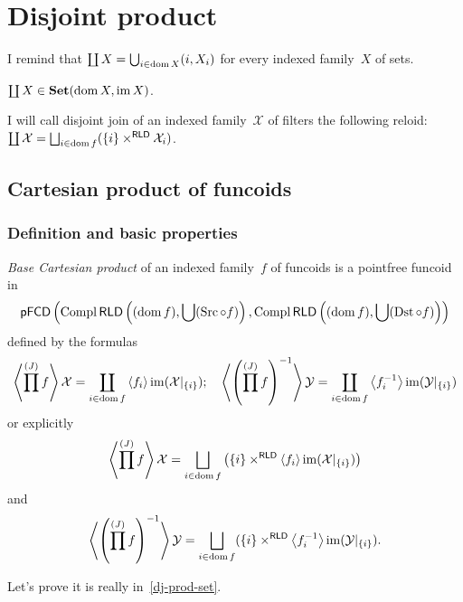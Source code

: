 \chapter{Disjoint product}

I remind that
$\coprod X = \bigcup_{i\in\operatorname{dom} X} (i,X_i)$
for every indexed family~$X$ of sets.

\begin{obvious}
$\coprod X\in\mathbf{Set}(\operatorname{dom} X,\operatorname{im} X)$.
\end{obvious}

\begin{defn}
I will call disjoint join of an indexed family~$\mathcal{X}$ of filters the following reloid: $\coprod\mathcal{X} = \bigsqcup_{i\in\dom f}(\{i\}\times^{\mathsf{RLD}}\mathcal{X}_i)$.
\end{defn}

\section{Cartesian product of funcoids}

\subsection{Definition and basic properties}

\begin{defn}
\emph{Base Cartesian product} of an indexed family~$f$ of funcoids is
a pointfree funcoid in
\begin{equation}\label{dj-prod-set}
\mathsf{pFCD}\left(\operatorname{Compl}\mathsf{RLD}\left((\operatorname{dom} f),\bigcup(\operatorname{Src}\circ f)\right), \operatorname{Compl}\mathsf{RLD}\left((\operatorname{dom} f),\bigcup(\operatorname{Dst}\circ f)\right)\right)
\end{equation}
defined by the formulas
\[
\left\langle \prod^{(J)}f\right\rangle \mathcal{X} =
\coprod_{i\in\operatorname{dom} f}\left\langle f_i\right\rangle\operatorname{im}(\mathcal{X}|_{\{i\}});\quad
\left\langle \left(\prod^{(J)}f\right)^{-1}\right\rangle \mathcal{Y} =
\coprod_{i\in\operatorname{dom} f}\left\langle f_i^{-1}\right\rangle\operatorname{im}(\mathcal{Y}|_{\{i\}})
\]
or explicitly
\[
\supfun{\prod^{(J)}f} \mathcal{X} =
\bigsqcup_{i\in\dom f}
\left(\{i\}\times^{\mathsf{RLD}}\supfun{f_i}\im(\mathcal{X}|_{\{i\}})\right)
\]
and
\[
\supfun{\left(\prod^{(J)}f\right)^{-1}} \mathcal{Y} =
\bigsqcup_{i\in\dom f}
(\{i\}\times^{\mathsf{RLD}}\supfun{f_i^{-1}}\im(\mathcal{Y}|_{\{i\}}).
\]
\end{defn}

Let's prove it is really in~\eqref{dj-prod-set}.

